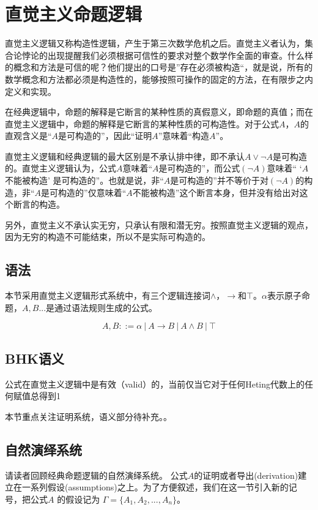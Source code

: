 \section{直觉主义命题逻辑}

直觉主义逻辑又称构造性逻辑，产生于第三次数学危机之后。直觉主义者认为，集合论悖论的出现提醒我们必须根据可信性的要求对整个数学作全面的审查。什么样的概念和方法是可信的呢？他们提出的口号是”存在必须被构造“，就是说，所有的数学概念和方法都必须是构造性的，能够按照可操作的固定的方法，在有限步之内定义和实现。


在经典逻辑中，命题的解释是它断言的某种性质的真假意义，即命题的真值；而在直觉主义逻辑中，命题的解释是它断言的某种性质的可构造性。对于公式$A$，$A$的直观含义是``$A$是可构造的''，因此``证明$A$''意味着``构造$A$''。


直觉主义逻辑和经典逻辑的最大区别是不承认排中律，即不承认$A \lor \neg A$是可构造的。直觉主义逻辑认为，公式$A$意味着``$A$是可构造的''，而公式$(\neg A)$意味着`` `$A$不能被构造' 是可构造的''。也就是说，非``$A$是可构造的''并不等价于对$(\neg A)$的构造，非``$A$是可构造的''仅意味着``$A$不能被构造''这个断言本身，但并没有给出对这个断言的构造。

另外，直觉主义不承认实无穷，只承认有限和潜无穷。按照直觉主义逻辑的观点，因为无穷的构造不可能结束，所以不是实际可构造的。


\subsection{语法}

本节采用直觉主义逻辑形式系统中，有三个逻辑连接词$\land$，$\to$和$\top$。$\alpha$表示原子命题，$A, B...$是通过语法规则生成的公式。

$$A, B ::= \alpha \ | \ A \to B \ | \ A \land B \ | \ \top$$




\subsection{BHK语义}

公式在直觉主义逻辑中是有效（valid）的，当前仅当它对于任何Heting代数上的任何赋值总得到1

本节重点关注证明系统，语义部分待补充。。



\subsection{自然演绎系统}

请读者回顾经典命题逻辑的自然演绎系统。 公式$A$的证明或者导出(derivation)建立在一系列假设(assumptions)之上。为了方便叙述，我们在这一节引入新的记号，把公式$A$ 的假设记为 $\Gamma = \{A_1, A_2,...,A_n\}$。

